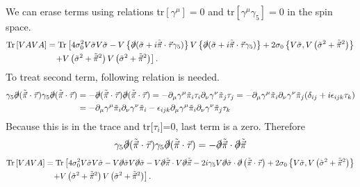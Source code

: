 \documentclass[tightenlines,floatfix,nofootinbib,superscriptaddress,fleqn]{revtex4-2}
\begin{document}
We can erase terms using relations tr$[\gamma^\mu]=0$ and tr$[\gamma^\mu\gamma_5]=0$ in the spin space. 
\begin{align}\label{1-1-2}
  \begin{split}
    \mathrm{Tr}\left[VAVA\right]
  &=\mathrm{Tr}\left[
    4\sigma^2_0V\tilde{\sigma}V\tilde{\sigma}
  -V\left\{\slashed{\partial}(\tilde{\sigma}+i\tilde{\vec{\pi}}\cdot\vec{\tau}\gamma_5)
  \right\}V\left\{\slashed{\partial}(\tilde{\sigma}+i\tilde{\vec{\pi}}\cdot\vec{\tau}
  \gamma_5)\right\}+2\sigma_0\left\{V\tilde{\sigma},V\left(\tilde{\sigma}^2+\tilde{\vec{\pi}}^2\right)
  \right\}\right.\\
  &\left.\,\,\,\,\,+V\left(\tilde{\sigma}^2+\tilde{\vec{\pi}}^2\right)V\left(\tilde{\sigma}^2
  +\tilde{\vec{\pi}}^2\right)\right].
\end{split}
\end{align}
To treat second term, following relation is needed.
\begin{align}\label{1-1-3}
  \begin{split}
    \gamma_5\slashed{\partial}(\tilde{\vec{\pi}}\cdot\vec{\tau})
    \gamma_5\slashed{\partial}(\tilde{\vec{\pi}}\cdot\vec{\tau})
    &=-\slashed{\partial}(\tilde{\vec{\pi}}\cdot\vec{\tau})\slashed{\partial}(\tilde{\vec{\pi}}\cdot\vec{\tau})
    =-\partial_\mu\gamma^\mu\tilde{\pi}_i\tau_i\partial_\nu\gamma^\nu\tilde{\pi}_j\tau_j
    =-\partial_\mu\gamma^\mu\tilde{\pi}_i\partial_\nu\gamma^\nu\tilde{\pi}_j(\delta_{ij}+i\epsilon_{ijk}\tau_k)  \\
    &=-\partial_\mu\gamma^\mu\tilde{\pi}_i\partial_\nu\gamma^\nu\tilde{\pi}_i
      -\epsilon_{ijk}\partial_\mu\gamma^\mu\tilde{\pi}_i\partial_\nu\gamma^\nu\tilde{\pi}_j\tau_k
  \end{split}
\end{align}
Because this is in the trace and tr[$\tau_i$]=0, last term is a zero. Therefore
\begin{align}\label{1-1-3-1}
  \begin{split}
    \gamma_5\slashed{\partial}(\tilde{\vec{\pi}}\cdot\vec{\tau})
    \gamma_5\slashed{\partial}(\tilde{\vec{\pi}}\cdot\vec{\tau})
    =-\slashed{\partial}\tilde{\vec{\pi}}\cdot
    \slashed{\partial}\tilde{\vec{\pi}}
  \end{split}
\end{align}
\begin{align}\label{1-1-4}
  \begin{split}
    \mathrm{Tr}\left[VAVA\right]
    &=\mathrm{Tr}\left[4\sigma^2_0V\tilde{\sigma}V\tilde{\sigma}
    -V\slashed{\partial}\tilde{\sigma}V\slashed{\partial}\tilde{\sigma}
    -V\slashed{\partial}\tilde{\vec{\pi}}\cdot V\slashed{\partial}\tilde{\vec{\pi}}
    -2i\gamma_5V\slashed{\partial}\tilde{\sigma}\cdot\slashed{\partial}\left(\tilde{\vec{\pi}}
    \cdot\vec{\tau}\right)+2\sigma_0\left\{V\tilde{\sigma},V\left(\tilde{\sigma}^2+\tilde{\vec{\pi}}^2\right)
    \right\}\right.\\
    &\left.\,\,\,\,\,+V\left(\tilde{\sigma}^2+\tilde{\vec{\pi}}^2\right)V\left(\tilde{\sigma}^2
    +\tilde{\vec{\pi}}^2\right)
    \right].
  \end{split}
\end{align}
\end{document}
